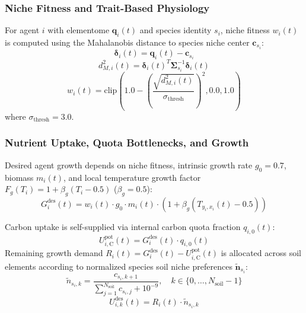 \documentclass[11pt,a4paper]{article}
\begin{document}
\subsubsection{Niche Fitness and Trait-Based Physiology}
For agent $i$ with elementome $\boldsymbol{q}_i(t)$ and species identity $s_i$, niche fitness $w_i(t)$ is computed using the Mahalanobis distance to species niche center $\boldsymbol{c}_{s_i}$:
\begin{equation}
\boldsymbol{\delta}_i(t) = \boldsymbol{q}_i(t) - \boldsymbol{c}_{s_i}
\end{equation}
\begin{equation}
d_{M, i}^2(t) = \boldsymbol{\delta}_i(t)^T \boldsymbol{\Sigma}_{s_i}^{-1} \boldsymbol{\delta}_i(t)
\end{equation}
\begin{equation}
w_i(t) = \text{clip}\left(1.0 - \left(\frac{\sqrt{d_{M, i}^2(t)}}{\sigma_{\text{thresh}}}\right)^2, 0.0, 1.0\right)
\end{equation}
where $\sigma_{\text{thresh}} = 3.0$.

\subsubsection{Nutrient Uptake, Quota Bottlenecks, and Growth}
Desired agent growth depends on niche fitness, intrinsic growth rate $g_0 = 0.7$, biomass $m_i(t)$, and local temperature growth factor $F_g(T_i) = 1 + \beta_g (T_i - 0.5)$ ($\beta_g = 0.5$):
\begin{equation}
G_i^{\text{des}}(t) = w_i(t) \cdot g_0 \cdot m_i(t) \cdot \left(1 + \beta_g (T_{y_i, x_i}(t) - 0.5)\right)
\end{equation}

Carbon uptake is self-supplied via internal carbon quota fraction $q_{i,0}(t)$:
\begin{equation}
U_{i, \text{C}}^{\text{pot}}(t) = G_i^{\text{des}}(t) \cdot q_{i,0}(t)
\end{equation}
Remaining growth demand $R_i(t) = G_i^{\text{des}}(t) - U_{i, \text{C}}^{\text{pot}}(t)$ is allocated across soil elements according to normalized species soil niche preferences $\tilde{\boldsymbol{n}}_{s_i}$:
\begin{equation}
\tilde{n}_{s_i, k} = \frac{c_{s_i, k+1}}{\sum_{j=1}^{N_{\text{soil}}} c_{s_i, j} + 10^{-9}}, \quad k \in \{0, \dots, N_{\text{soil}}-1\}
\end{equation}
\begin{equation}
U_{i, k}^{\text{des}}(t) = R_i(t) \cdot \tilde{n}_{s_i, k}
\end{equation}
\end{document}
